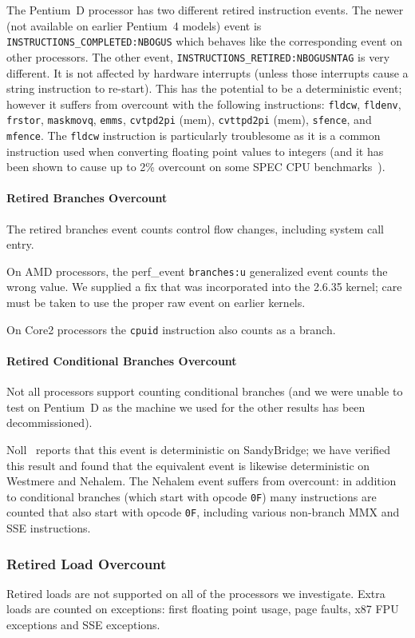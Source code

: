 The Pentium~D processor has two different 
retired instruction events.  
The newer (not available on earlier Pentium~4 models)
event is {\tt INSTRUCTIONS\_COMPLETED:NBOGUS} which behaves like the 
corresponding event on other processors.
The other event, {\tt INSTRUCTIONS\-\_RETIRED\-:NBOGUSNTAG} is very different.
It is not affected by hardware interrupts (unless those interrupts cause a 
string instruction to re-start).  
This has the potential to be a deterministic event; however 
it suffers from overcount with the following instructions:
{\tt fldcw}, 
{\tt fldenv}, {\tt frstor}, {\tt maskmovq}, {\tt emms}, {\tt cvtpd2pi} (mem),
{\tt cvttpd2pi} (mem), {\tt sfence}, and {\tt mfence}.  
The {\tt fldcw}
instruction is particularly troublesome as it is a common instruction
used when converting floating point values to integers (and it has
been shown to cause up to 2\%
overcount on some SPEC CPU benchmarks~\cite{weaver+:iiswc08}).

\paragraph{Retired Branches Overcount}
The retired branches event counts control flow changes, 
including system call entry.

On AMD processors, the perf\_event {\tt branches:u} generalized event counts 
the wrong value.  We supplied a fix that was incorporated into the 2.6.35
kernel; care must be taken to use the proper 
raw event on earlier kernels.

On Core2 processors the {\tt cpuid} instruction also counts as a branch.

\paragraph{Retired Conditional Branches Overcount}
Not all processors support counting 
conditional branches (and we were unable
to test on Pentium~D as the machine we used 
for the other results has been decommissioned).

Noll~\cite{noll:pc2011} reports that this event
is deterministic on SandyBridge; we have verified
this result and found that the equivalent event
is likewise deterministic on Westmere and Nehalem.
The Nehalem event suffers from overcount:
in addition to conditional branches (which start with opcode {\tt 0F})
many instructions are counted that also start with opcode {\tt 0F},
including various non-branch MMX and SSE instructions.

\subsubsection{Retired Load Overcount} 
Retired loads are not supported on all of the processors we investigate.
Extra loads are counted on exceptions: first floating point usage,
page faults, x87 FPU exceptions and SSE exceptions.

